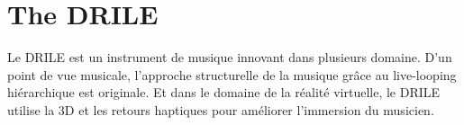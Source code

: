 \section{The DRILE}

Le DRILE est un instrument de musique innovant dans plusieurs domaine. D'un point de vue musicale, l'approche structurelle de la musique grâce au live-looping hiérarchique est originale. Et dans le domaine de la réalité virtuelle, le DRILE utilise la 3D et les retours haptiques pour améliorer l'immersion du musicien.







